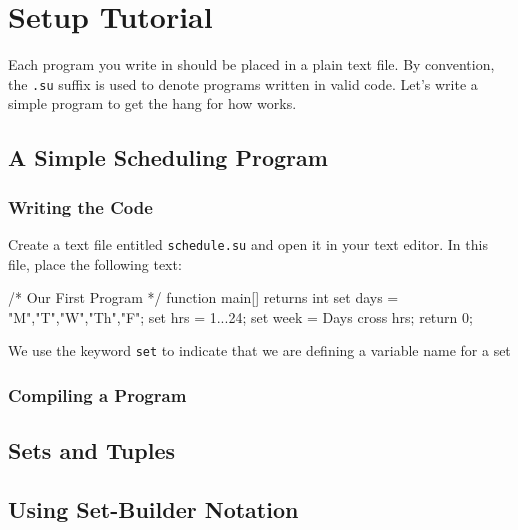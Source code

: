 \chapter{Setup Tutorial}
Each program you write in \lang should be placed in a plain text file.  By convention, the \verb|.su| suffix is used to denote programs written in valid \lang code.  Let's write a simple program to get the hang for how \lang works.

\section{A Simple Scheduling Program}
\subsection{Writing the Code}
Create a text file entitled \verb|schedule.su| and open it in your text editor.  In this file, place the following text:

\begin{code}
/* Our First Program */
function main[] returns int {
   set days = {"M","T","W","Th","F"};
   set hrs = {1...24};
   set week = Days cross hrs;
   return 0;   
   }
\end{code}

We use the keyword \verb|set| to indicate that we are defining a variable name for a set
\subsection{Compiling a Program}


\section{Sets and Tuples}
\section{Using Set-Builder Notation}
